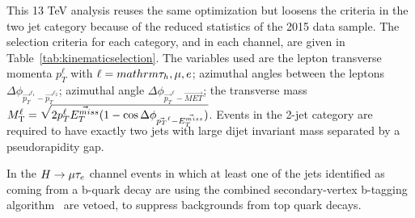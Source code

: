 \documentclass[oneside, letterpaper, oldfontcommands]{memoir}
\begin{document}
{{{This 13 TeV analysis reuses the same optimization but loosens the criteria in
the two jet category because of the reduced statistics of the 2015 data sample.
The selection criteria for each category, and in each channel, are given in Table~\ref{tab:kinematicselection}.
The variables used are the lepton transverse momenta $p_{T}^{\ell}$ with $\ell=mathrm{\tau_{h}},\mu,e$; azimuthal angles between the leptons
$\Delta \phi_{\vec{p_{T}}^{\ell_{1}}-\vec{p_{T}}^{\ell_{2}}}$;
azimuthal angle $\Delta \phi_{\vec{p_{T}}^{\ell}-\vec{MET}}$; the transverse mass
$M_\mathrm{T}^{\ell}=\sqrt{\smash[b]{2p_{T}^{\ell}\vec{E_{T}^{miss}}(1-\cos{\Delta \phi_{\vec{p_{T}}^{\ell}-\vec{E_{T}^{miss}}}})}}$.
Events  in  the 2-jet
category are required to have exactly two jets with large dijet invariant mass separated by a pseudorapidity gap.

In the $H \rightarrow \mu \mathrm{\tau}_{e}$ channel events in which at least one of the jets  identified
as coming from a b-quark decay are  using the combined secondary-vertex b-tagging
algorithm~\cite{Chatrchyan:2012jua} are vetoed, to suppress backgrounds from top quark decays.

}}}
\end{document}
